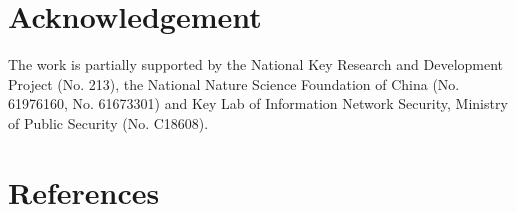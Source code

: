 \documentclass[review]{elsarticle}
\begin{document}
\section*{Acknowledgement}
	The work is partially supported by the National Key Research and Development Project (No. 213), the National Nature Science Foundation of China (No.  61976160, No. 61673301) and Key Lab of Information Network Security, Ministry of Public Security (No. C18608).
\section*{References}


%

\end{document}
